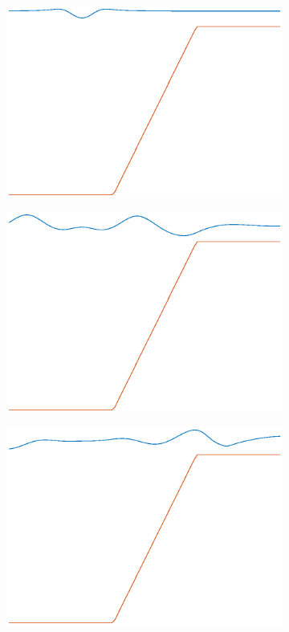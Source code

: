 \documentclass[12pt]{article}
\begin{document}
\begin{figure}[!h]
\centering
\begin{subfigure}[b]{0.24\textwidth}
\includegraphics[width=\textwidth]{fig/2dLin1.eps}
\label{fig1}
\end{subfigure}
\begin{subfigure}[b]{0.24\textwidth}
\includegraphics[width=\textwidth]{fig/2dLin2.eps}
\label{fig1}
\end{subfigure}
\begin{subfigure}[b]{0.24\textwidth}
\includegraphics[width=\textwidth]{fig/2dLin3.eps}

\end{subfigure}
\end{figure}
\end{document}
